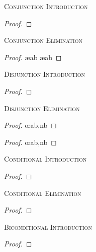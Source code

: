 \label{nd-proofrules}


\textsc{Conjunction Introduction}

\begin{proof}
	 
\end{proof}

\textsc{Conjunction Elimination}

\begin{proof}
	 \ae{ab}
	 \ae{ab}
\end{proof}


\textsc{Disjunction Introduction}

\begin{proof}
\end{proof}

\textsc{Disjunction Elimination}

\begin{proof}
	 \oe{ab,nb}
\end{proof}

\begin{proof}
	 \oe{ab,nb}
\end{proof}


\textsc{Conditional Introduction}

\nopagebreak
\begin{proof}
	\open
		 
	\close
\end{proof}

\pagebreak
\textsc{Conditional Elimination}

\begin{proof}
	 
\end{proof}

\textsc{Biconditional Introduction}

\begin{proof}
	 
\end{proof}

